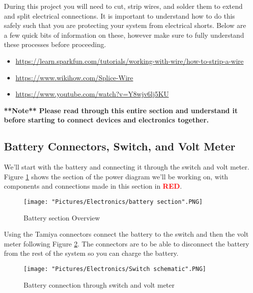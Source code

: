 \documentclass[12pt]{article}
\begin{document}
\noindent During this project you will need to cut, strip wires, and solder them to extend and split electrical connections. It is important to understand how to do this safely such that you are protecting your system from electrical shorts. Below are a few quick bits of information on these, however make sure to fully understand these processes before proceeding. 

\begin{itemize}
	\item \href{https://learn.sparkfun.com/tutorials/working-with-wire/how-to-strip-a-wire}{https://learn.sparkfun.com/tutorials/working-with-wire/how-to-strip-a-wire}
	\item \href{https://www.wikihow.com/Splice-Wire}{https://www.wikihow.com/Splice-Wire}
	\item \href{https://www.youtube.com/watch?v=Y8wjv6lj5KU}{https://www.youtube.com/watch?v=Y8wjv6lj5KU}
\end{itemize}

 \textbf{**Note** Please read through this entire section and understand it before starting to connect devices and electronics together. }

\subsection{Battery Connectors, Switch, and Volt Meter}

We'll start with the battery and connecting it through the switch and volt meter. Figure \ref{battery section} shows the section of the power diagram we'll be working on, with components and connections made in this section in \textcolor{red}{\textbf{RED}}.

\begin{figure}[H]
  	\centering
    	\texttt{[image: "Pictures/Electronics/battery section".PNG]}
 	\caption{Battery section Overview}
	\label{battery section}
\end{figure}

Using the Tamiya connectors connect the battery to the switch and then the volt meter following Figure \ref{sw sch}. The connectors are to be able to disconnect the battery from the rest of the system so you can charge the battery. 

\begin{figure}[H]
  	\centering
    	\texttt{[image: "Pictures/Electronics/Switch schematic".PNG]}
 	\caption{Battery connection through switch and volt meter}
	\label{sw sch}
\end{figure}
\end{document}
